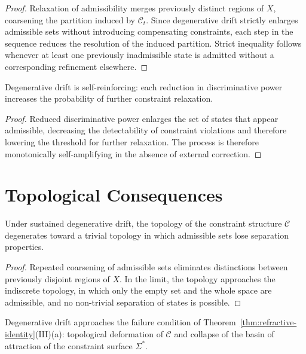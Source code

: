 \documentclass[11pt,openany]{book}
\begin{document}
\begin{proof}
Relaxation of admissibility merges previously distinct
regions of $X$, coarsening the partition induced by
$\mathcal{C}_t$.  Since degenerative drift strictly enlarges
admissible sets without introducing compensating constraints,
each step in the sequence reduces the resolution of the
induced partition.  Strict inequality follows whenever at
least one previously inadmissible state is admitted without
a corresponding refinement elsewhere.
\end{proof}

\begin{corollary}
\label{cor:self-reinforcing}
Degenerative drift is self-reinforcing: each reduction in
discriminative power increases the probability of further
constraint relaxation.
\end{corollary}

\begin{proof}
Reduced discriminative power enlarges the set of states
that appear admissible, decreasing the detectability of
constraint violations and therefore lowering the threshold
for further relaxation.  The process is therefore
monotonically self-amplifying in the absence of external
correction.
\end{proof}

\section{Topological Consequences}
\label{sec:topological}

\begin{proposition}
\label{prop:topology-collapse}
Under sustained degenerative drift, the topology of the
constraint structure $\mathcal{C}$ degenerates toward a
trivial topology in which admissible sets lose separation
properties.
\end{proposition}

\begin{proof}
Repeated coarsening of admissible sets eliminates
distinctions between previously disjoint regions of $X$.
In the limit, the topology approaches the indiscrete
topology, in which only the empty set and the whole space
are admissible, and no non-trivial separation of states is
possible.
\end{proof}

\begin{corollary}
\label{cor:threshold}
Degenerative drift approaches the failure condition of
Theorem~\ref{thm:refractive-identity}(III)(a): topological
deformation of $\mathcal{C}$ and collapse of the basin of
attraction of the constraint surface $\Sigma^*$.
\end{corollary}
\end{document}
